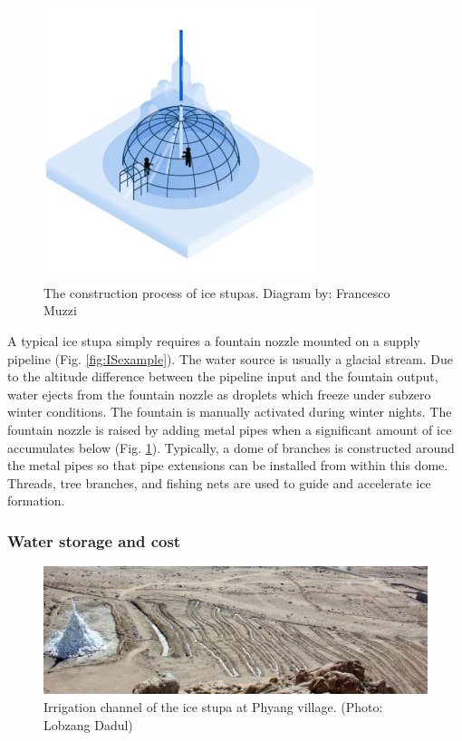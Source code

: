 \begin{figure}[htb]
	\centering
	\includegraphics[width=8cm]{figs/IS_science.jpg}
	\caption{The construction process of ice stupas. Diagram by: Francesco Muzzi }
	\label{fig:ISconstruction}
\end{figure}

A typical ice stupa simply requires a fountain nozzle mounted on a supply pipeline (Fig. \ref{fig:ISexample}).
The water source is usually a glacial stream. Due to the altitude difference between the pipeline input and the
fountain output, water ejects from the fountain nozzle as droplets which freeze under subzero winter conditions.
The fountain is manually activated during winter nights. The fountain nozzle is raised by adding
metal pipes when a significant amount of ice accumulates below (Fig. \ref{fig:ISconstruction}). Typically, a dome of
branches is constructed around the metal pipes so that pipe extensions can be installed from within this dome.
Threads, tree branches, and fishing nets are used to guide and accelerate ice formation.

\subsubsection{Water storage and cost}
\label{sec:icestupa_irr}

\begin{figure}[htb]
	\centering
	\includegraphics[width=\textwidth]{figs/IS_irrigation.jpeg}
	\caption{Irrigation channel of the ice stupa at Phyang village. (Photo: Lobzang Dadul) }
	\label{fig:ISirrigation}
\end{figure}

